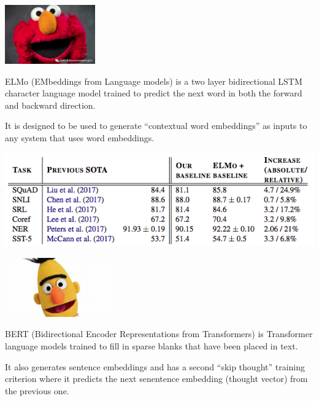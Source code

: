 {

\centerline{\includegraphics[height = 1in]{../images/ELMob}}

\vfill
ELMo (EMbeddings from Language models) is a two layer bidirectional LSTM character language model trained to predict the next word
in both the forward and backward direction.

\vfill
It is designed to be used to generate ``contextual word embeddings'' as inputs to any system that uses word embeddings.


\centerline{\includegraphics[width=8in]{../images/ELMo}}




\centerline{\includegraphics[height = 1in]{../images/BERTb}}

\vfill
BERT (Bidirectional Encoder Representations from Transformers) is Transformer language models trained to fill in sparse blanks that have been placed in text.

\vfill
It also generates sentence embeddings and has a second ``skip thought'' training criterion where it predicts the next senentence embedding (thought vector)
from the previous one.

}
